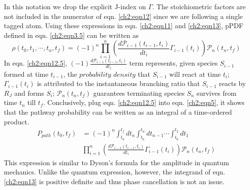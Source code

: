 In this notation we drop the explicit J-index on $\Gamma$. The stoichiometric factors are not
included in the numerator of eqn. \ref{ch2:eqn12} since we are following a single tagged
atom. Using these expressions in eqn. \ref{ch2:eqn11} and \ref{ch2:eqn13}, pPDF defined in eqn. \ref{ch2:eqn3.5} can be written as 
\begin{equation}
\label{ch2:eqn12.5}
\rho(t_0, t_1, \cdots, t_n, t_f) = (-1)^n \prod_{i=1}^{n}{\left( \frac{d\mathcal{P}_{i-1}(t_{i-1},t_i)}{dt_i} \Gamma_{i-1}(t_i) \right) \mathcal{P}_{n}(t_n,t_f)}
\end{equation}
In eqn. \ref{ch2:eqn12.5}, $(-1)\frac{d\mathcal{P}_{i-1}(t_{i-1},t_i)}{dt_i}$ term represents, given species $S_{i-1}$ formed at time $t_{i-1}$, the $probability$ $density$ that $S_{i-1}$ will react at time $t_i$; $\Gamma_{i-1}(t_i)$ is attributed to the instantaneous branching ratio that $S_{i-1}$ reacts by $R_J$ and forms $S_i$; $\mathcal{P}_{n}(t_n,t_f)$ guarantees terminating species $S_n$ survives from time $t_n$ till $t_f$. Conclusively, plug eqn. \ref{ch2:eqn12.5} into eqn. \ref{ch2:eqn5}, it shows that the pathway probability can be
written as an integral of a time-ordered product.\cite{ch1_IRPC_16_bai2014sum,ch1_IRPC_17_bai2015sum}
\begin{equation}
\label{ch2:eqn13}
\begin{split}
P_{path}(t_0,t_f)&= (-1)^n \int_{t_0}^{t_f}{dt_n \int_{t_0}^{t_n}{dt_{n-1} \cdots }} \int_{t_0}^{t_2}{dt_1} \\
&  \prod_{i=1}^{n}{\left( \frac{d\mathcal{P}_{i-1}(t_{i-1},t_i)}{dt_i} \Gamma_{i-1}(t_i) \right) \mathcal{P}_{n}(t_n,t_f)}
\end{split}
\end{equation}
This expression is similar to Dyson’s formula for the amplitude in quantum mechanics.\cite{ch1_IRPC_38_schulmann1996techniques,ch1_IRPC_39_mjolsness2013time} Unlike the quantum expression, however, the integrand of eqn. \ref{ch2:eqn13} is positive definite and thus phase cancellation is not an issue.
\newline

